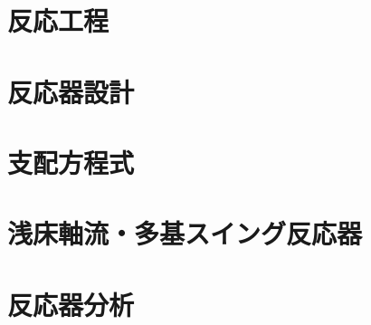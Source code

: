 \documentclass[11pt,aspectratio=43,dvipsnames]{beamer}
\begin{document}
\setcounter{framenumber}{4}
\section{反応工程}
\section{反応器設計}
\section{支配方程式}
\section{浅床軸流・多基スイング反応器}
\section{反応器分析}
\end{document}

